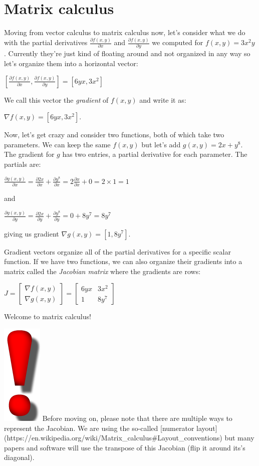 \documentclass[11pt]{article}
\begin{document}
\section{Matrix calculus}

Moving from vector calculus to matrix calculus now, let's consider what we do with the partial derivatives $\frac{\partial f(x,y)}{\partial x}$ and $\frac{\partial f(x,y)}{\partial y}$ we computed for $f(x,y) = 3x^2y$. Currently they're just kind of floating around and not organized in any way so let's organize them into a horizontal vector:

$[ \frac{\partial f(x,y)}{\partial x}, \frac{\partial f(x,y)}{\partial y}] = [6yx, 3x^2]$

We call this vector the {\em gradient} of $f(x,y)$ and write it as:

$\nabla f(x,y) = [6yx, 3x^2]$.

Now, let's get crazy and consider two functions, both of which take two parameters.  We can keep the same $f(x,y)$ but let's add $g(x,y) = 2x + y^8$.  The gradient for $g$ has two entries, a partial derivative for each parameter. The partials are:

$\frac{\partial g(x,y)}{\partial x} = \frac{\partial 2x}{\partial x} + \frac{\partial y^8}{\partial x} = 2\frac{\partial x}{\partial x} + 0 = 2 \times 1 = 1$

and

$\frac{\partial g(x,y)}{\partial y} = \frac{\partial 2x}{\partial y} + \frac{\partial y^8}{\partial y} = 0 + 8y^7 = 8y^7$

giving us gradient $\nabla g(x,y) = [1, 8y^7]$.

Gradient vectors organize all of the partial derivatives for a specific scalar function. If we have two functions, we can also organize their gradients into a matrix called the {\em Jacobian matrix} where the gradients are rows:

$J =
\begin{bmatrix}
	\nabla f(x,y)\\
	\nabla g(x,y)
\end{bmatrix} = \begin{bmatrix}
	6yx & 3x^2\\
	1 & 8y^7
\end{bmatrix}
$

Welcome to matrix calculus!

\includegraphics[scale=.08]{redbang.png} Before moving on, please note that there are multiple ways to represent the Jacobian. We are using the so-called [numerator layout](https://en.wikipedia.org/wiki/Matrix\_calculus\#Layout\_conventions) but many papers and software will use the transpose of this Jacobian (flip it around its's diagonal).
\end{document}
